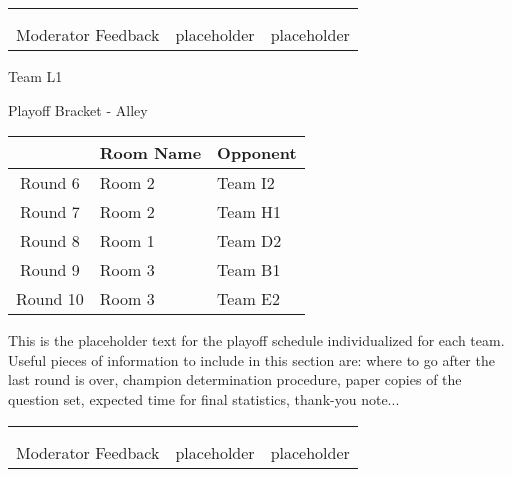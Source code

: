 \documentclass{article}%
\begin{document}
\newline%
%
\begin{tabularx}{\textwidth}{YYY}%
  &  &  \\%
\\%
Moderator Feedback&placeholder&placeholder\\%
\end{tabularx}%
\newpage%
\begin{center}%
\begin{Huge}%
Team L1%
\end{Huge}%
\vspace*{12pt}%
\linebreak%
\begin{Large}%
Playoff Bracket {-} Alley%
\end{Large}%
\end{center}%
\vspace*{4pt}%
%
\begin{tabularx}{\textwidth}{|c|Y|Y|}%
\hline%
&Room Name&Opponent\\%
\hline%
Round 6&Room 2&Team I2\\%
Round 7&Room 2&Team H1\\%
Round 8&Room 1&Team D2\\%
Round 9&Room 3&Team B1\\%
Round 10&Room 3&Team E2\\%
\hline%
\end{tabularx}%
\vspace*{30pt}%
\linebreak%
This is the placeholder text for the playoff schedule individualized for each team. Useful pieces of information to include in this section are: where to go after the last round is over, champion determination procedure, paper copies of the question set, expected time for final statistics, thank{-}you note...%
\vspace*{30pt}%
\newline%
%
\begin{tabularx}{\textwidth}{YYY}%
  &  &  \\%
\\%
Moderator Feedback&placeholder&placeholder\\%
\end{tabularx}%
\end{document}
